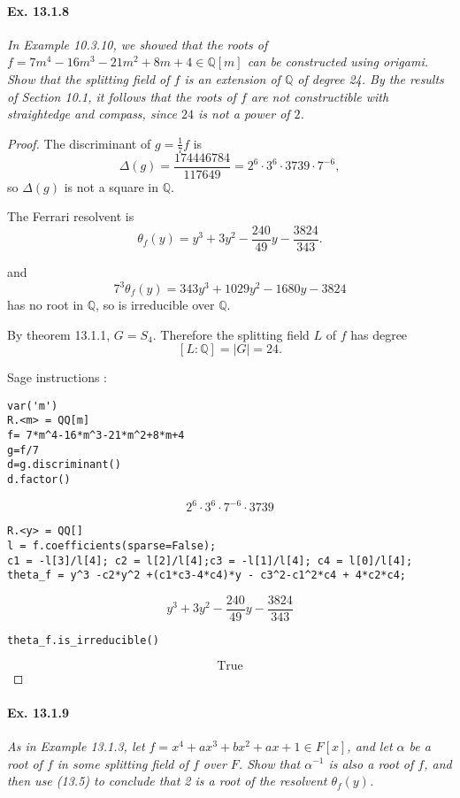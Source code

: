 \documentclass[11pt,a4paper]{article}
\newcommand{\Q}{\mathbb{Q}}
\begin{document}
\paragraph{Ex. 13.1.8}

{\it In Example 10.3.10, we showed that the roots of $f=7m^4 - 16 m^3 -21 m^2 + 8m+4 \in \Q[m]$ can be constructed using origami. Show that the splitting field of $f$ is an extension of $\Q$ of degree 24. By the results of Section 10.1, it follows that the roots of $f$ are not constructible with straightedge and compass, since $24$ is not a power of $2$.
}

\begin{proof}
The discriminant of $g = \frac{1}{7} f$  is 
$$\Delta(g) = \frac{174446784}{117649} = 2^6\cdot 3^6\cdot 3739\cdot 7^{-6},$$
so $\Delta(g)$ is not a square in $\Q$.

The Ferrari resolvent is
$$\theta_f(y) = y^{3} + 3 y^{2} - \frac{240}{49} y - \frac{3824}{343}.$$

and $$7^3 \theta_f(y) = 343 y^{3} + 1029 y^{2} - 1680 y - 3824$$
has no root in $\Q$, so is irreducible over $\Q$.

By theorem 13.1.1, $G = S_4$.
Therefore the splitting field $L$ of $f$ has degree
$$[L:\Q] = |G| = 24.$$

\bigskip

Sage instructions :
\begin{verbatim}
var('m')
R.<m> = QQ[m]
f= 7*m^4-16*m^3-21*m^2+8*m+4
g=f/7
d=g.discriminant()
d.factor()
\end{verbatim}
$$2^{6} \cdot 3^{6} \cdot 7^{-6} \cdot 3739$$
\begin{verbatim}
R.<y> = QQ[]
l = f.coefficients(sparse=False);
c1 = -l[3]/l[4]; c2 = l[2]/l[4];c3 = -l[1]/l[4]; c4 = l[0]/l[4];
theta_f = y^3 -c2*y^2 +(c1*c3-4*c4)*y - c3^2-c1^2*c4 + 4*c2*c4;
\end{verbatim}
$$y^{3} + 3 y^{2} - \frac{240}{49} y - \frac{3824}{343}$$
\begin{verbatim}
theta_f.is_irreducible()
\end{verbatim}
$$\text{True}$$
\end{proof}

\paragraph{Ex. 13.1.9}

{\it As in Example 13.1.3, let $f = x^4+ax^3+bx^2+ax+1 \in F[x]$, and let $\alpha$ be a root of $f$ in some splitting field of $f$ over $F$. Show that $\alpha^{-1}$ is also a root of $f$, and then use (13.5) to conclude that 2 is a root of the resolvent $\theta_f(y)$.
}
\end{document}
